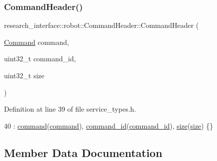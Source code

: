 \mbox{\label{structresearch__interface_1_1robot_1_1CommandHeader_acce3f51a361d5c9ec6099ca78f6a83ac}} 
\subsubsection{\texorpdfstring{Command\+Header()}{CommandHeader()}\hspace{0.1cm}{\footnotesize\ttfamily [2/2]}}
{\footnotesize\ttfamily research\+\_\+interface\+::robot\+::\+Command\+Header\+::\+Command\+Header (\begin{DoxyParamCaption}\item[{\hyperlink{namespaceresearch__interface_1_1robot_a72624b344f0614e623ef21a53fb0aa50}{Command}}]{command,  }\item[{uint32\+\_\+t}]{command\+\_\+id,  }\item[{uint32\+\_\+t}]{size }\end{DoxyParamCaption})\hspace{0.3cm}{\ttfamily [inline]}}



Definition at line 39 of file service\+\_\+types.\+h.


\begin{DoxyCode}
40       : \hyperlink{structresearch__interface_1_1robot_1_1CommandHeader_aad68e81f17365edd95d80c7f35684edc}{command}(\hyperlink{structresearch__interface_1_1robot_1_1CommandHeader_aad68e81f17365edd95d80c7f35684edc}{command}), \hyperlink{structresearch__interface_1_1robot_1_1CommandHeader_a915f5eddf273cb6279e817b2aa80a5bb}{command\_id}(\hyperlink{structresearch__interface_1_1robot_1_1CommandHeader_a915f5eddf273cb6279e817b2aa80a5bb}{command\_id}), 
      \hyperlink{structresearch__interface_1_1robot_1_1CommandHeader_a1f4f17f7edc9169e3eb0ca7480d17b34}{size}(\hyperlink{structresearch__interface_1_1robot_1_1CommandHeader_a1f4f17f7edc9169e3eb0ca7480d17b34}{size}) \{\}
\end{DoxyCode}


\subsection{Member Data Documentation}
\mbox{\label{structresearch__interface_1_1robot_1_1CommandHeader_aad68e81f17365edd95d80c7f35684edc}} 
